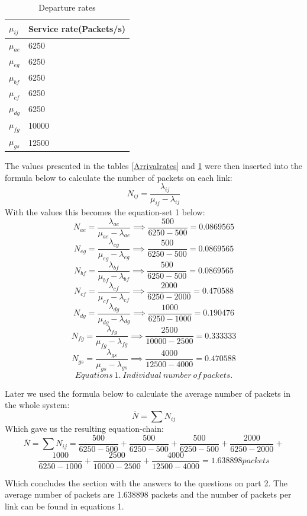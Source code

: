 \documentclass{article}
\begin{document}
\begin{table}[h]
\centering
\label{departurerates}
\caption{Departure rates}
\begin{tabular}{|l|l|}
\hline
$\mu_{ij}$ & Service rate(Packets/s)\\ \hline
$\mu_{ae}$ & 6250 \\ \hline
$\mu_{eg}$ & 6250 \\ \hline
$\mu_{bf}$ & 6250 \\ \hline
$\mu_{cf}$ & 6250 \\ \hline
$\mu_{dg}$ & 6250 \\ \hline
$\mu_{fg}$ & 10000 \\ \hline
$\mu_{gs}$ & 12500 \\ \hline
\end{tabular}
\end{table}
The values presented in the tables \ref{Arrivalrates} and \ref{departurerates} were then inserted into the formula below to calculate the number of packets on each link:
$$N_{ij} = \frac{\lambda_{ij}}{\mu_{ij} - \lambda_{ij} }$$
With the values this becomes the equation-set 1 below:
$$N_{ae} = \frac{\lambda_{ae}}{\mu_{ae} - \lambda_{ae} } \implies \frac{500}{6250 - 500 } = 0.0869565 $$
$$N_{eg} = \frac{\lambda_{eg}}{\mu_{eg} - \lambda_{eg} } \implies \frac{500}{6250 - 500 } = 0.0869565 $$
$$N_{bf} = \frac{\lambda_{bf}}{\mu_{bf} - \lambda_{bf} } \implies \frac{500}{6250 - 500 } = 0.0869565 $$
$$N_{cf} = \frac{\lambda_{cf}}{\mu_{cf} - \lambda_{cf} } \implies \frac{2000}{6250 - 2000 } = 0.470588 $$
$$N_{dg} = \frac{\lambda_{dg}}{\mu_{dg} - \lambda_{dg} } \implies \frac{1000}{6250 - 1000 } = 0.190476 $$
$$N_{fg} = \frac{\lambda_{fg}}{\mu_{fg} - \lambda_{fg} } \implies \frac{2500}{10000 - 2500 } = 0.333333 $$
$$N_{gs} = \frac{\lambda_{gs}}{\mu_{gs} - \lambda_{gs} } \implies \frac{4000}{12500 - 4000 } = 0.470588 $$
$$Equations\ 1.\ Individual\ number\ of\ packets.$$

Later we used the formula below to calculate the average number of packets in the whole system:
$$ \overline{N} = \sum N_{ij} $$
Which gave us the resulting equation-chain:
$$ \overline{N} = \sum N_{ij} = \frac{500}{6250 - 500 } + \frac{500}{6250 - 500 } + \frac{500}{6250 - 500 } + \frac{2000}{6250 - 2000 } + $$ 
$$ \frac{1000}{6250 - 1000 } + \frac{2500}{10000 - 2500 } + \frac{4000}{12500 - 4000 } = 1.638898 packets $$ 


Which concludes the section with the answers to the questions on part 2. The average number of packets are 1.638898 packets and the number of packets per link can be found in equations 1.
\end{document}
